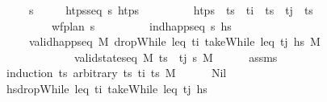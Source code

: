 \begin{isabellebody}
\ \ \ \ \ {\isasympi}s\isanewline
\ \ \ \ \ {\isachardoublequoteopen}htps{\isacharunderscore}{\kern0pt}seq\ {\isasympi}s\ htps{\isachardoublequoteclose}\isanewline
\ \ \ \ \ \ \ \ \ {\isachardoublequoteopen}htps\ {\isacharequal}{\kern0pt}\ ts\ {\isacharat}{\kern0pt}\ t\isactrlsub i\ {\isacharhash}{\kern0pt}\ ts\ {\isacharat}{\kern0pt}\ t\isactrlsub j\ {\isacharhash}{\kern0pt}\ ts\ \isanewline
\ \ \ \ \ \ \ \ \ {\isachardoublequoteopen}wf{\isacharunderscore}{\kern0pt}plan\ {\isasympi}s{\isachardoublequoteclose}\isanewline
\ \ \ \ \ \ \ \ \ {\isachardoublequoteopen}ind{\isacharunderscore}{\kern0pt}happ{\isacharunderscore}{\kern0pt}seq\ {\isasympi}s\ hs{\isachardoublequoteclose}\isanewline
\ \ \ \ \ {\isachardoublequoteopen}valid{\isacharunderscore}{\kern0pt}happ{\isacharunderscore}{\kern0pt}seq\ M\ {\isacharparenleft}{\kern0pt}dropWhile\ {\isacharparenleft}{\kern0pt}leq\ t\isactrlsub i{\isacharparenright}{\kern0pt}\ {\isacharparenleft}{\kern0pt}takeWhile\ {\isacharparenleft}{\kern0pt}leq\ t\isactrlsub j{\isacharparenright}{\kern0pt}\ hs{\isacharparenright}{\kern0pt}{\isacharparenright}{\kern0pt}\ M{\isacharprime}{\kern0pt}\ \isanewline
\ \ \ \ \ \ \ \ \ \ \ \ {\isasymlongleftrightarrow}\ valid{\isacharunderscore}{\kern0pt}state{\isacharunderscore}{\kern0pt}seq\ M\ {\isacharparenleft}{\kern0pt}ts\ {\isacharat}{\kern0pt}\ {\isacharbrackleft}{\kern0pt}t\isactrlsub j{\isacharbrackright}{\kern0pt}{\isacharparenright}{\kern0pt}\ {\isasympi}s\ M{\isacharprime}{\kern0pt}{\isachardoublequoteclose}\isanewline
%
\isadelimproof
\ \ \ \ %
\endisadelimproof
%
\isatagproof
{}\isamarkupfalse%
\ assms\ \isanewline
\ \ \isamarkupfalse%
\ {\isacharparenleft}{\kern0pt}induction\ ts\ arbitrary{\isacharcolon}{\kern0pt}\ ts\ t\isactrlsub i\ ts\ M{\isacharparenright}{\kern0pt}\isanewline
\ \ \ \ \isamarkupfalse%
\ Nil\isanewline
\ \ \ \ \isamarkupfalse%
\ {\isacharquery}{\kern0pt}hs{\isacharprime}{\kern0pt}{\isacharequal}{\kern0pt}{\isachardoublequoteopen}dropWhile\ {\isacharparenleft}{\kern0pt}leq\ t\isactrlsub i{\isacharparenright}{\kern0pt}\ {\isacharparenleft}{\kern0pt}takeWhile\ {\isacharparenleft}{\kern0pt}leq\ t\isactrlsub j{\isacharparenright}{\kern0pt}\ hs{\isacharparenright}{\kern0pt}{\isachardoublequoteclose}\isanewline

\end{isabellebody}
